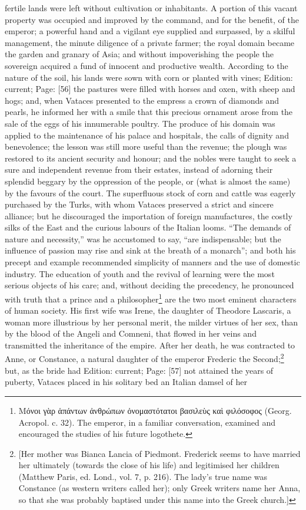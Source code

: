 fertile lands were left without cultivation or inhabitants. A portion of this vacant property was occupied and improved by the command, and for the benefit, of the emperor; a powerful hand and a vigilant eye supplied and surpassed, by a skilful management, the minute diligence of a private farmer; the royal domain became the garden and granary of Asia; and without impoverishing the people the sovereign acquired a fund of innocent and productive wealth. According to the nature of the soil, his lands were sown with corn or planted with vines; Edition: current; Page: [56] the pastures were filled with horses and oxen, with sheep and hogs; and, when Vataces presented to the empress a crown of diamonds and pearls, he informed her with a smile that this precious ornament arose from the sale of the eggs of his innumerable poultry. The produce of his domain was applied to the maintenance of his palace and hospitals, the calls of dignity and benevolence; the lesson was still more useful than the revenue; the plough was restored to its ancient security and honour; and the nobles were taught to seek a sure and independent revenue from their estates, instead of adorning their splendid beggary by the oppression of the people, or (what is almost the same) by the favours of the court. The superfluous stock of corn and cattle was eagerly purchased by the Turks, with whom Vataces preserved a strict and sincere alliance; but he discouraged the importation of foreign manufactures, the costly silks of the East and the curious labours of the Italian looms. \texthebrew{“}The demands of nature and necessity,\texthebrew{}” was he accustomed to say, \texthebrew{“}are indispensable; but the influence of passion may rise and sink at the breath of a monarch\texthebrew{}”; and both his precept and example recommended simplicity of manners and the use of domestic industry. The education of youth and the revival of learning were the most serious objects of his care; and, without deciding the precedency, he pronounced with truth that a prince and a philosopher\footnote{\textgreek{Μόνοι γ\texthebrew{ὰ}ρ \texthebrew{ἁ}πάντων \texthebrew{ἀ}νθρώπων \texthebrew{ὀ}νομαστότατοι βασιλε\texthebrew{ὺ}ς κα\texthebrew{ὶ} φιλόσοφος} (Georg. Acropol. c. 32). The emperor, in a familiar conversation, examined and encouraged the studies of his future logothete.} are the two most eminent characters of human society. His first wife was Irene, the daughter of Theodore Lascaris, a woman more illustrious by her personal merit, the milder virtues of her sex, than by the blood of the Angeli and Comneni, that flowed in her veins and transmitted the inheritance of the empire. After her death, he was contracted to Anne, or Constance, a natural daughter of the emperor Frederic the Second;\footnote{[Her mother was Bianca Lancia of Piedmont. Frederick seems to have married her ultimately (towards the close of his life) and legitimised her children (Matthew Paris, ed. Lond., vol. 7, p. 216). The lady\texthebrew{}’s true name was Constance (as western writers called her); only Greek writers name her Anna, so that she was probably baptised under this name into the Greek church.]} but, as the bride had Edition: current; Page: [57] not attained the years of puberty, Vataces placed in his solitary bed an Italian damsel of her 